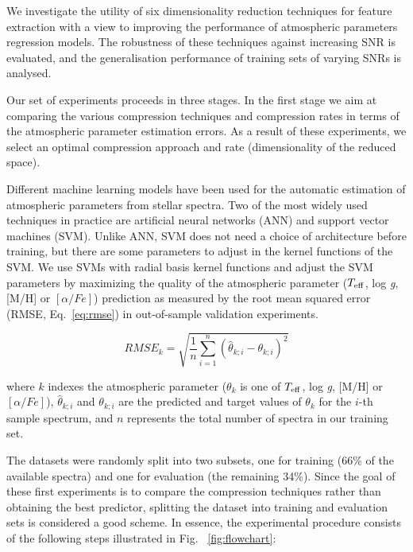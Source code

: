 \documentclass[a4paper,fleqn,usenatbib]{mnras}
\begin{document}
{{{We investigate the utility of six dimensionality reduction techniques
for feature extraction with a view to improving the performance of
atmospheric parameters regression models. The robustness of these
techniques against increasing SNR is evaluated, and the generalisation
performance of training sets of varying SNRs is analysed.

Our set of experiments proceeds in three stages. In the first stage we
aim at comparing the various compression techniques and compression
rates in terms of the atmospheric parameter estimation errors. As a
result of these experiments, we select an optimal compression approach
and rate (dimensionality of the reduced space).

Different machine learning models have been used for the automatic
estimation of atmospheric parameters from stellar spectra. Two of the
most widely used techniques in practice are artificial neural networks
(ANN) and support vector machines (SVM). Unlike ANN, SVM does not need
a choice of architecture before training, but there are some
parameters to adjust in the kernel functions of the SVM. We use SVMs
with radial basis kernel functions and adjust the SVM parameters by
maximizing the quality of the atmospheric parameter ($T_{\rm eff}$,
log \textit{g}, [M/H] or $\left[ \alpha/Fe \right]$) prediction as 
measured by the root mean squared error (RMSE, Eq.~\ref{eq:rmse}) 
in out-of-sample validation experiments.

\begin{equation}
\label{eq:rmse}
RMSE_k=\sqrt{\frac{1}{n}\sum_{i=1}^{n}\left(\hat{\theta}_{k;i}-\theta_{k;i}\right)^{2}}
\end{equation}

where $k$ indexes the atmospheric parameter 
	(${\theta}_{k}$ is one of $T_{\rm eff}$, log \textit{g}, 
	[M/H] or $\left[ \alpha/Fe \right]$), $\hat{\theta}_{k;i}$ and $\theta_{k;i}$
	are the predicted and target values of ${\theta}_{k}$ for the $i$-th 
	sample spectrum, and $n$ represents the total number of spectra in our training set.
  
The datasets were randomly split into two subsets, one for training
(66\% of the available spectra) and one for evaluation (the remaining
34\%). Since the goal of these first experiments is to compare the
compression techniques rather than obtaining the best predictor,
splitting the dataset into training and evaluation sets is considered
a good scheme. In essence, the experimental procedure consists of the
following steps illustrated in Fig.~ \ref{fig:flowchart}:

}}}
\end{document}
